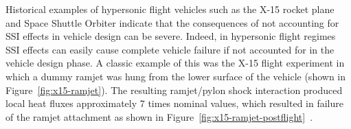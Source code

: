 Historical examples of hypersonic flight vehicles such as the X-15 rocket plane and Space Shuttle Orbiter indicate that the consequences of not accounting for SSI effects in vehicle design can be severe.  Indeed, in hypersonic flight regimes SSI effects can easily cause complete vehicle failure if not accounted for in the vehicle design phase.  A classic example of this was the X-15 flight experiment in which a dummy ramjet was hung from the lower surface of the vehicle (shown in Figure~\ref{fig:x15-ramjet}).  The resulting ramjet/pylon shock interaction produced local heat fluxes approximately 7 times nominal values, which resulted in failure of the ramjet attachment as shown in Figure~\ref{fig:x15-ramjet-postflight}~\cite{x15_historical_perspective}.
\begin{figure}
  \begin{center}
     \\
     \hspace{.5em}

\end{center}
\end{figure}
